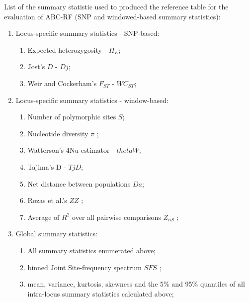 \documentclass[12pt]{article}
\begin{document}
List of the summary statistic used to produced the reference table for the evaluation of ABC-RF (SNP and windowed-based summary statistics):
\begin{enumerate}
	\item Locus-specific summary statistics - SNP-based:
    \begin{enumerate}
    	\item Expected heterozygosity - $H_E$;
        \item Jost's $D$ \citep{Jost:2008cs,Jost:2009hn} - $Dj$;
        \item Weir and Cockerham's $F_{ST}$ \citep{Weir:1984dx} - $WC_{ST}$;
    \end{enumerate}
    \item Locus-specific summary statistics - window-based:
    \begin{enumerate}
        \item Number of polymorphic sites $S$;
        \item Nucleotide diversity $\pi$ \citep{Nei:1979uk};
        \item Watterson's 4Nu estimator \citep{Watterson:1975bh} - $thetaW$;
        \item Tajima's D \citep{Tajima:1989un} - $TjD$;
        \item Net distance between populations $Da$;
        \item Rozas et al.'s $ZZ$ \citep{Rozas:2001wc};
        \item Average of $R^2$ over all pairwise comparisons $Z_{nS}$ \citep{Kelly:1997uja}; 
    \end{enumerate}
    \item Global summary statistics:
    \begin{enumerate}
        \item All summary statistics enumerated above;
        \item binned Joint Site-frequency spectrum $SFS$ \citep{Ewing:2016gv};
        \item mean, variance, kurtosis, skewness and the 5\% and 95\% quantiles of all intra-locus summary statistics calculated above;
    \end{enumerate}
\end{enumerate}



\end{document}
